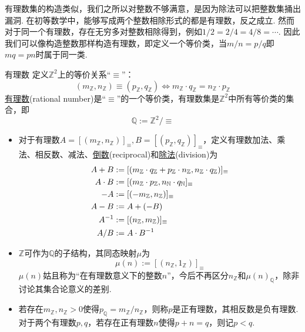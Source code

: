 \documentclass[main.tex]{subfiles}
\begin{document}
有理数集的构造类似，我们之所以对整数不够满意，是因为除法可以把整数集捅出漏洞. 在初等数学中，能够写成两个整数相除形式的都是有理数，反之成立. 然而对于同一个有理数，存在无穷多对整数相除得到，例如\(1/2=2/4=4/8=\cdots\). 因此我们可以像构造整数那样构造有理数，即定义一个等价类，当\(m/n=p/q\)即\(mq=pn\)时属于同一类.

\begin{definition}{有理数}
    定义\(\mathbb{Z}^2\)上的等价关系“\(\equiv\)”：
    \[(m_{\mathbb{Z}},n_{\mathbb{Z}}) \equiv (p_{\mathbb{Z}},q_{\mathbb{Z}}) \Leftrightarrow m_{\mathbb{Z}} \cdot q_{\mathbb{Z}}=n_{\mathbb{Z}} \cdot p_{\mathbb{Z}}\]
    \uline{有理数}(rational number)是“\(\equiv\)”的一个等价类，有理数集是\(\mathbb{Z}^2\)中所有等价类的集合，即
    \[\mathbb{Q} := \mathbb{Z}^2/\equiv\]
    \begin{itemize}
        \item 对于有理数\(A = [(m_{\mathbb{Z}},n_{\mathbb{Z}})]_{\equiv}, B = [(p_{\mathbb{Z}},q_{\mathbb{Z}})]_{\equiv}\)，定义有理数加法、乘法、相反数、减法、\uline{倒数}(reciprocal)和\uline{除法}(division)为
        \[
            \begin{aligned}
                \relax A+B &:= [(m_{\mathbb{Z}} \cdot q_{\mathbb{Z}} + p_{\mathbb{Z}} \cdot n_{\mathbb{Z}},n_{\mathbb{Z}} \cdot q_{\mathbb{Z}})]_{\equiv}\\
                A \cdot B &:= [(m_{\mathbb{Z}} \cdot p_{\mathbb{Z}}, n_{\mathbb{N}} \cdot q_{\mathbb{N}}]_\equiv \\
                -A &:= [(-m_{\mathbb{Z}},n_{\mathbb{Z}})]_\equiv \\
                A - B &:= A + (-B) \\ 
                A^{-1} &:= [(n_{\mathbb{Z}},m_{\mathbb{Z}})]_\equiv \\
                A/B &:= A \cdot B^{-1}
            \end{aligned}
        \]
        \item \(\mathbb{Z}\)可作为\(\mathbb{Q}\)的子结构，其同态映射\(\mu\)为
        \[\mu(n) := [(n_{\mathbb{Z}},1_{\mathbb{Z}})]_{\equiv}\]
        \(\mu(n)\)姑且称为“在有理数意义下的整数\(n\)”，今后不再区分\(n_{\mathbb{Z}}\)和\(\mu(n)_{\mathbb{Q}}\)，除非讨论其集合论意义的差别.
        \item 若存在\(m_{\mathbb{Z}},n_{\mathbb{Z}}>0\)使得\(p_{\mathbb{Q}} = m_{\mathbb{Z}}/n_{\mathbb{Z}}\)，则称\(p\)是正有理数，其相反数是负有理数. 对于两个有理数\(p,q\)，若存在正有理数\(n\)使得\(p+n=q\)，则记\(p<q\).
        
    \end{itemize}
\end{definition}
\end{document}
